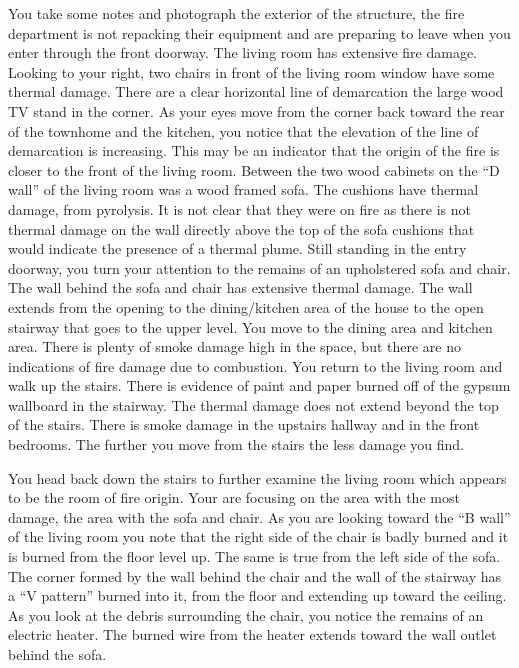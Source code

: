 \documentclass[twoside]{uocthesis}
\begin{document}
{You take some notes and photograph the exterior of the structure, the fire department is not repacking their equipment and are preparing to leave when you enter through the front doorway.  The living room has extensive fire damage.  Looking to your right, two chairs in front of the living room window have some thermal damage.  There are a clear horizontal line of demarcation the large wood TV stand in the corner.  As your eyes move from the corner back toward the rear of the townhome and the kitchen, you notice that the elevation of the line of demarcation is increasing.  This may be an indicator that the origin of the fire is closer to the front of the living room.  Between the two wood cabinets on the ``D wall'' of the living room was a wood framed sofa.  The cushions have thermal damage, from pyrolysis.  It is not clear that they were on fire as there is not thermal damage on the wall directly above the top of the sofa cushions that would indicate the presence of a thermal plume.  Still standing in the entry doorway, you turn your attention to the remains of an upholstered sofa and chair.  The wall behind the sofa and chair has extensive thermal damage.  The wall extends from the opening to the dining/kitchen area of the house to the open stairway that goes to the upper level.  You move to the dining area and kitchen area.  There is plenty of smoke damage high in the space, but there are no indications of fire damage due to combustion.  You return to the living room and walk up the stairs.  There is evidence of paint and paper burned off of the gypsum wallboard in the stairway.  The thermal damage does not extend beyond the top of the stairs.  There is smoke damage in the upstairs hallway and in the front bedrooms. The further you move from the stairs the less damage you find.  

You head back down the stairs to further examine the living room which appears to be the room of fire origin. Your are focusing on the area with the most damage, the area with the sofa and chair.  As you are looking toward the ``B wall'' of the living room you note that the right side of the chair is badly burned and it is burned from the floor level up.  The same is true from the left side of the sofa.  The corner formed by the wall behind the chair and the wall of the stairway has a ``V pattern'' burned into it, from the floor and extending up toward the ceiling.  As you look at the debris surrounding the chair, you notice the remains of an electric heater.  The burned wire from the heater extends toward the wall outlet behind the sofa.

}
\end{document}
